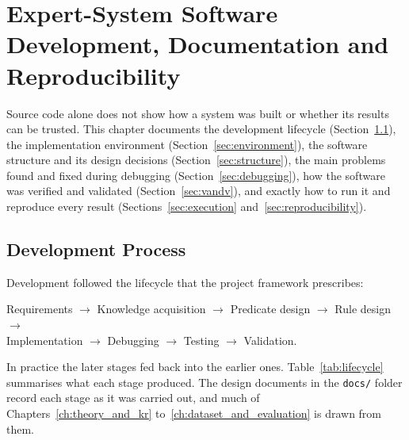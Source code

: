 \chapter{Expert-System Software Development, Documentation and Reproducibility}
\label{ch:software_and_reproducibility}

Source code alone does not show how a system was built or whether its results can be trusted. This chapter documents the development lifecycle (Section~\ref{sec:process}), the implementation environment (Section~\ref{sec:environment}), the software structure and its design decisions (Section~\ref{sec:structure}), the main problems found and fixed during debugging (Section~\ref{sec:debugging}), how the software was verified and validated (Section~\ref{sec:vandv}), and exactly how to run it and reproduce every result (Sections~\ref{sec:execution} and~\ref{sec:reproducibility}).

\section{Development Process}
\label{sec:process}

Development followed the lifecycle that the project framework prescribes:
\begin{center}
  Requirements $\rightarrow$ Knowledge acquisition $\rightarrow$ Predicate design $\rightarrow$ Rule design $\rightarrow$\\
  Implementation $\rightarrow$ Debugging $\rightarrow$ Testing $\rightarrow$ Validation.
\end{center}
In practice the later stages fed back into the earlier ones. Table~\ref{tab:lifecycle} summarises what each stage produced. The design documents in the \texttt{docs/} folder record each stage as it was carried out, and much of Chapters~\ref{ch:theory_and_kr} to~\ref{ch:dataset_and_evaluation} is drawn from them.

